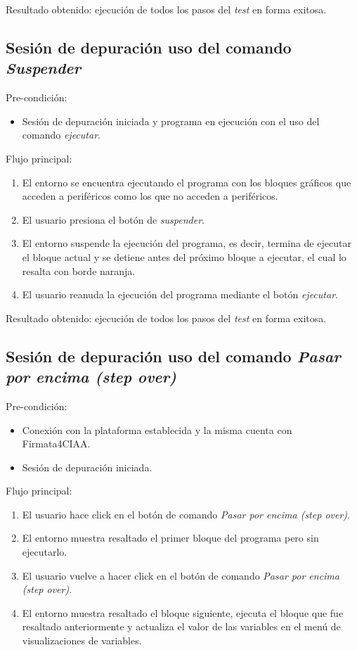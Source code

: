 Resultado obtenido: ejecución de todos los pasos del \emph{test} en forma exitosa. 

\subsection{Sesión de depuración uso del comando \emph{Suspender}}
Pre-condición:
\begin{itemize}
	\item Sesión de depuración iniciada y programa en ejecución con el uso del comando \emph{ejecutar}.
\end{itemize}

Flujo principal:
\begin{enumerate}
	\item
	El entorno se encuentra ejecutando el programa con los bloques gráficos que acceden a periféricos como los que no acceden a periféricos.
	\item
	El usuario presiona el botón de \emph{suspender}.
	\item
	El entorno suspende la ejecución del programa, es decir, termina de ejecutar el bloque actual y se detiene antes del próximo bloque a ejecutar, el cual lo resalta con borde naranja.
	\item
	El usuario reanuda la ejecución del programa mediante el botón \emph{ejecutar}.
\end{enumerate}

Resultado obtenido: ejecución de todos los pasos del \emph{test} en forma exitosa.

\subsection{Sesión de depuración uso del comando \emph{Pasar por encima (step over)}}
Pre-condición:
\begin{itemize}
		\item Conexión con la plataforma establecida y la misma cuenta con Firmata4CIAA.
		\item Sesión de depuración iniciada. 
\end{itemize}

Flujo principal:
\begin{enumerate}
	\item
	El usuario hace click en el botón de comando \emph{Pasar por encima (step over)}.
	\item
	El entorno muestra resaltado el primer bloque del programa pero sin ejecutarlo.
	\item
	El usuario vuelve a hacer click en el botón de comando \emph{Pasar por encima (step over)}.
	\item
	El entorno muestra resaltado el bloque siguiente, ejecuta el bloque que fue resaltado anteriormente y actualiza el valor de las variables en el menú de visualizaciones de variables.
\end{enumerate}

